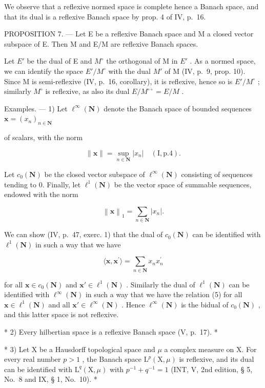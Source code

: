 We observe that a reflexive normed space is complete hence a Banach space, and that its dual is a reflexive Banach space by prop. 4 of IV, p.~16.

PROPOSITION 7. --- Let E be a reflexive Banach space and M a closed vector subspace of E. Then M and E/M are reflexive Banach spaces.

Let \(E'\) be the dual of E and \(M^{\circ}\) the orthogonal of M in \(E'\) . As a normed space, we can identify the space \(E'/M^{\circ}\) with the dual \(M'\) of M (IV, p.~9, prop. 10). Since M is semi-reflexive (IV, p.~16, corollary), it is reflexive, hence so is \(E'/M^{\circ}\) ; similarly \(M^{\circ}\) is reflexive, as also its dual \(E/M^{\circ\circ} = E/M\) .

Examples. --- 1) Let \(\ell^{\infty}(\mathbf{N})\) denote the Banach space of bounded sequences \(\mathbf{x} = (x_n)_{n\in \mathbf{N}}\)

of scalars, with the norm

\[
\| \mathbf {x} \| = \sup _ {n \in \mathbf {N}} | x _ {n} | \quad (\mathrm{I}, \text {p.} 4).\tag{3}
\]

Let \(c_{0}(\mathbf{N})\) be the closed vector subspace of \(\ell^{\infty}(\mathbf{N})\) consisting of sequences tending to 0. Finally, let \(\ell^{1}(\mathbf{N})\) be the vector space of summable sequences, endowed with the norm

\[
\left\| \mathbf {x} \right\| _ {1} = \sum_ {n \in \mathbf {N}} \left| x _ {n} \right|.\tag{4}
\]

We can show (IV, p.~47, exerc. 1) that the dual of \(c_0(\mathbf{N})\) can be identified with \(\ell^1 (\mathbf{N})\) in such a way that we have

\[
\langle \mathbf {x}, \mathbf {x} ^ {\prime} \rangle = \sum_ {n \in \mathbf {N}} x _ {n} x _ {n} ^ {\prime}\tag{5}
\]

for all \(\mathbf{x} \in c_0(\mathbf{N})\) and \(\mathbf{x}' \in \ell^1(\mathbf{N})\) . Similarly the dual of \(\ell^1(\mathbf{N})\) can be identified with \(\ell^\infty(\mathbf{N})\) in such a way that we have the relation (5) for all \(\mathbf{x} \in \ell^1(\mathbf{N})\) and all \(\mathbf{x}' \in \ell^\infty(\mathbf{N})\) . Hence \(\ell^\infty(\mathbf{N})\) is the bidual of \(c_0(\mathbf{N})\) , and this latter space is not reflexive.

* 2) Every hilbertian space is a reflexive Banach space (V, p.~17). *

* 3) Let X be a Hausdorff topological space and \(\mu\) a complex measure on X. For every real number \(p > 1\) , the Banach space \(\mathrm{L}^p (\mathrm{X},\mu)\) is reflexive, and its dual can be identified with \(\mathrm{L}^q (\mathrm{X},\mu)\) with \(p^{-1} + q^{-1} = 1\) (INT, V, 2nd edition, § 5, No.~8 and IX, § 1, No.~10). *

